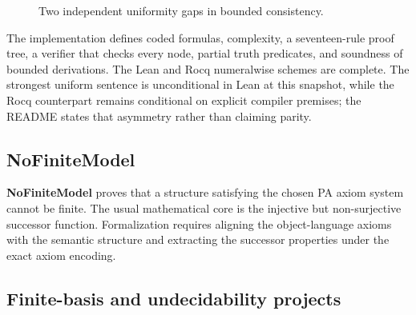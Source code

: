 \documentclass[
  10pt,
  a4paper,
  twoside,
  open=any,
  parskip=half,
  headings=big
]{scrreprt}
\newcommand{\project}[1]{\textsf{\bfseries #1}}
\begin{document}
\begin{figure}[htbp]
\centering
{}
\caption{Two independent uniformity gaps in bounded consistency.}
\label{fig:bounded-gaps}
\end{figure}

The implementation defines coded formulas, complexity, a seventeen-rule proof
tree, a verifier that checks every node, partial truth predicates, and
soundness of bounded derivations.  The Lean and Rocq numeralwise schemes are
complete.  The strongest uniform sentence is unconditional in Lean at this
snapshot, while the Rocq counterpart remains conditional on explicit compiler
premises; the README states that asymmetry rather than claiming parity.

\subsection{NoFiniteModel}

\project{NoFiniteModel} proves that a structure satisfying the chosen PA axiom
system cannot be finite.  The usual mathematical core is the injective but
non-surjective successor function.  Formalization requires aligning the
object-language axioms with the semantic structure and extracting the
successor properties under the exact axiom encoding.

\subsection{Finite-basis and undecidability projects}
\end{document}
